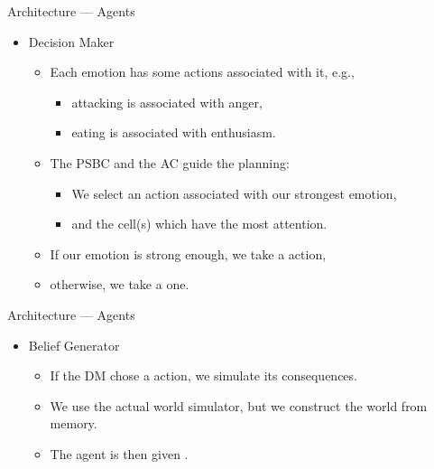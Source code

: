    \begin{frame}{Architecture --- Agents}
      \begin{itemize}
         \item Decision Maker
         \begin{itemize}
            \item Each emotion has some actions associated with it, e.g.,
            \begin{itemize}
               \item attacking is associated with anger,
               \item eating is associated with enthusiasm.
            \end{itemize}
            \pause
            \item The PSBC and the AC guide the planning:
            \begin{itemize}
               \item We select an action associated with our strongest emotion,
               \item and the cell(s) which have the most attention.
            \end{itemize}
            \pause
            \item If our emotion is strong enough, we take a  action,
            \item otherwise, we take a  one.
         \end{itemize}
      \end{itemize}
      
   \end{frame}
   
   \begin{frame}{Architecture --- Agents}
      \begin{itemize}
         \item Belief Generator
         \begin{itemize}
            \item If the DM chose a  action, we simulate its consequences.
            \item We use the actual world simulator, but we construct the world from memory.
            \item The agent is then given .
         \end{itemize}
      \end{itemize}
      
   \end{frame}
   

